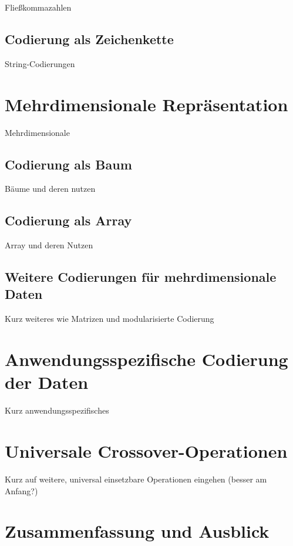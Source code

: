 \documentclass{llncs}
\begin{document}
Fließkommazahlen

\subsection{Codierung als Zeichenkette}
\label{sec:StrCod}

String-Codierungen

\section{Mehrdimensionale Repräsentation}
\label{sec:MehrdimRep}

Mehrdimensionale

\subsection{Codierung als Baum}
\label{sec:BaumCod}

Bäume und deren nutzen

\subsection{Codierung als Array}
\label{sec:ArrayCod}

Array und deren Nutzen

\subsection{Weitere Codierungen für mehrdimensionale Daten}
\label{sec:WeitereMehrdimensionale}

Kurz weiteres wie Matrizen und modularisierte Codierung

\section{Anwendungsspezifische Codierung der Daten}
\label{sec:AnwendungsspezifischeCod}

Kurz anwendungsspezifisches

\section{Universale Crossover-Operationen}
\label{sec:UniversaleOp}

Kurz auf weitere, universal einsetzbare Operationen eingehen (besser am Anfang?)

\section{Zusammenfassung und Ausblick}
\label{sec:Zusammenfassung}
\end{document}
